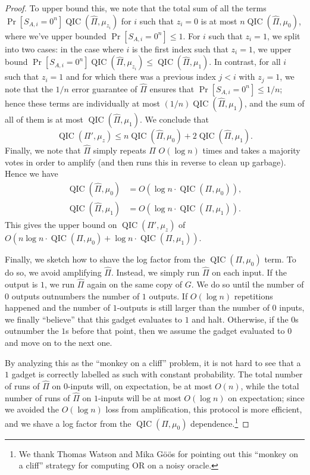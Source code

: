 \documentclass[10pt,a4paper]{article}
\theoremstyle{definition}
\renewcommand{\>}{\rangle}
\newcommand{\<}{\langle}
\DeclareMathOperator{\QIC}{QIC}
\begin{document}
\begin{proof}
To upper bound this, we note that the total sum of
all the terms $\Pr[S_{A,i}=0^n]\QIC(\hat{\Pi},\mu_{z_i})$ for
$i$ such that $z_i=0$ is at most $n\QIC(\hat{\Pi},\mu_0)$,
where we've upper bounded $\Pr[S_{A,i}=0^n]\le 1$.
For $i$ such that $z_i=1$, we split into two cases:
in the case where $i$ is the first index such that $z_i=1$,
we upper bound
$\Pr[S_{A,i}=0^n]\QIC(\hat{\Pi},\mu_{z_i})\le \QIC(\hat{\Pi},\mu_1)$.
In contrast, for all $i$ such that $z_i=1$ and for which
there was a previous index $j<i$ with $z_j=1$, we note that
the $1/n$ error guarantee of $\hat{\Pi}$ ensures that
$\Pr[S_{A,i}=0^n]\le 1/n$; hence these terms are individually
at most $(1/n)\QIC(\hat{\Pi},\mu_1)$, and the sum of all of them
is at most $\QIC(\hat{\Pi},\mu_1)$. We conclude that
\[\QIC(\Pi',\mu_z)\le n\QIC(\hat{\Pi},\mu_0)+2\QIC(\hat{\Pi},\mu_1).\]
Finally, we note that $\hat{\Pi}$ simply repeats $\Pi$
$O(\log n)$ times and takes a majority votes in order to amplify
(and then runs this in reverse to clean up garbage). Hence
we have
\begin{align*}
\QIC(\hat{\Pi},\mu_0)&=O(\log n\cdot \QIC(\Pi,\mu_0)),\\
\QIC(\hat{\Pi},\mu_1)&=O(\log n\cdot \QIC(\Pi,\mu_1)).
\end{align*}
This gives the upper bound on $\QIC(\Pi',\mu_z)$ of
$O(n\log n\cdot \QIC(\Pi,\mu_0)+\log n\cdot \QIC(\Pi,\mu_1))$.

Finally, we sketch how to shave the log factor from the $\QIC(\Pi,\mu_0)$
term. To do so, we avoid amplifying $\hat{\Pi}$. Instead,
we simply run $\hat{\Pi}$ on each input. If the output is $1$,
we run $\hat{\Pi}$ again on the same copy of $G$. We do so until
the number of $0$ outputs outnumbers the number of $1$ outputs.
If $O(\log n)$ repetitions happened and the number of $1$-outputs
is still larger than the number of $0$ inputs, we finally
``believe'' that this gadget evaluates to $1$ and halt.
Otherwise, if the $0$s outnumber the $1$s before that point,
then we assume the gadget evaluated to $0$ and move on to the
next one.

By analyzing this as the ``monkey on a cliff'' problem,
it is not hard to see that a $1$ gadget is correctly
labelled as such with constant probability.
The total number of runs of $\hat{\Pi}$ on $0$-inputs
will, on expectation, be at most $O(n)$, while the total
number of runs of $\hat{\Pi}$ on $1$-inputs will be
at most $O(\log n)$ on expectation; since we avoided
the $O(\log n)$ loss from amplification, this protocol
is more efficient, and we shave a log factor from the
$\QIC(\Pi,\mu_0)$ dependence.\footnote{We thank
Thomas Watson and Mika G{\"o}{\"o}s for pointing out
this ``monkey on a cliff'' strategy for computing OR on a noisy oracle.}
\end{proof}
\end{document}

